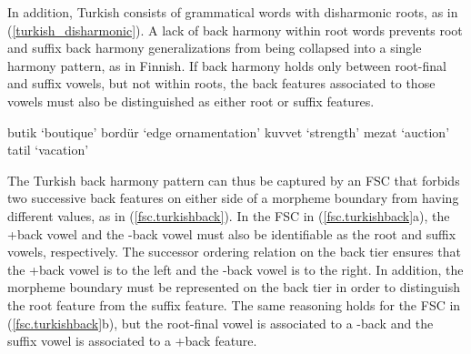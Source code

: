 \documentclass[,doc,floatsintext]{apa6}
\theoremstyle{definition}
\theoremstyle{definition}
\theoremstyle{definition}
\theoremstyle{remark}
\begin{document}
In addition, Turkish consists of grammatical words with disharmonic
roots, as in (\ref{turkish_disharmonic}). A lack of back harmony within
root words prevents root and suffix back harmony generalizations from
being collapsed into a single harmony pattern, as in Finnish. If back
harmony holds only between root-final and suffix vowels, but not within
roots, the back features associated to those vowels must also be
distinguished as either root or suffix features.

\begin{exe}
\label{turkish_disharmonic} 
\begin{xlist}
  \ex butik   `boutique'
  \ex bordür  `edge ornamentation'
  \ex kuvvet  `strength'
  \ex mezat   `auction'
  \ex tatil   `vacation'
\end{xlist}
\end{exe}

The Turkish back harmony pattern can thus be captured by an FSC that
forbids two successive back features on either side of a morpheme
boundary from having different values, as in (\ref{fsc.turkishback}). In
the FSC in (\ref{fsc.turkishback}a), the +back vowel and the -back vowel
must also be identifiable as the root and suffix vowels, respectively.
The successor ordering relation on the back tier ensures that the +back
vowel is to the left and the -back vowel is to the right. In addition,
the morpheme boundary must be represented on the back tier in order to
distinguish the root feature from the suffix feature. The same reasoning
holds for the FSC in (\ref{fsc.turkishback}b), but the root-final vowel
is associated to a -back and the suffix vowel is associated to a +back
feature.

\begin{exe}
\ex \label{fsc.turkishback}
\end{exe}
\end{document}
